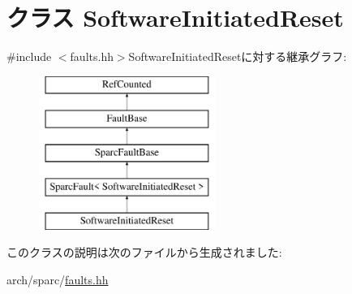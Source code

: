 \hypertarget{classSparcISA_1_1SoftwareInitiatedReset}{
\section{クラス SoftwareInitiatedReset}
\label{classSparcISA_1_1SoftwareInitiatedReset}
}


{\ttfamily \#include $<$faults.hh$>$}SoftwareInitiatedResetに対する継承グラフ:\begin{figure}[H]
\begin{center}
\leavevmode
\includegraphics[height=5cm]{classSparcISA_1_1SoftwareInitiatedReset}
\end{center}
\end{figure}


このクラスの説明は次のファイルから生成されました:\begin{DoxyCompactItemize}
\item 
arch/sparc/\hyperlink{arch_2sparc_2faults_8hh}{faults.hh}\end{DoxyCompactItemize}
